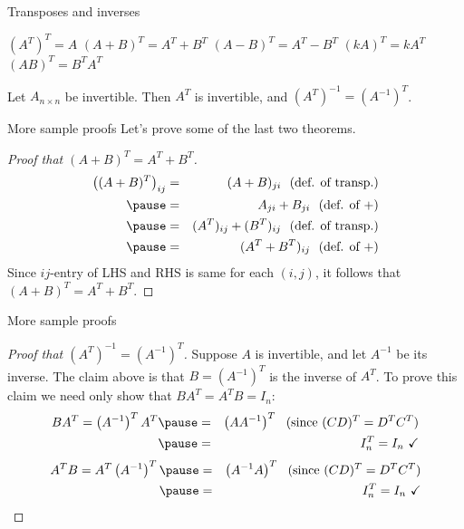 \begin{frame}{Transposes and inverses}
\begin{theorem}
\begin{multicols}{2}
\bb[(a)]
\ii $\left(A^T\right)^T=A$
\ii $(A+B)^T=A^T+B^T$
\ii $(A-B)^T=A^T-B^T$
\ii $(kA)^T=kA^T$
\ii $(AB)^T=B^TA^T$
\ee
\end{multicols}
\end{theorem}
\pause\begin{theorem}
Let $A_{n\times n}$ be invertible. Then $A^T$ is invertible, and $\left(A^T\right)^{-1}=\left(A^{-1}\right)^T$. 
\end{theorem}
\end{frame}
\begin{frame}{More sample proofs}
Let's prove some of the last two theorems. 
\pause
\begin{proof}[Proof that $(A+B)^T=A^T+B^T$]
\begin{eqnarray*}
\left((A+B)^T\right)_{ij}&=&(A+B)_{ji} \ \text{ (def. of transp.)}\\
\pause &=&A_{ji}+B_{ji} \ \text{ (def. of +)}\\
\pause &=&(A^T)_{ij}+(B^T)_{ij} \ \text{ (def. of transp.)}\\
\pause &=&(A^T+B^T)_{ij} \ \text{ (def. of +)}
\end{eqnarray*}
Since $ij$-entry of LHS and RHS is same for each $(i,j)$, it follows that $(A+B)^T=A^T+B^T$.  
\end{proof}
\end{frame}
\begin{frame}{More sample proofs}
\begin{proof}[Proof that $\left(A^T\right)^{-1}=\left(A^{-1}\right)^T$]
\pause Suppose $A$ is invertible, and let $A^{-1}$ be its inverse. The claim above is that $B=\left(A^{-1}\right)^T$ is the inverse of $A^T$.  To prove this claim we need only show that $BA^T=A^TB=I_n$: 
\pause
\begin{eqnarray*}
BA^T=\left(A^{-1}\right)^TA^T\pause &=&\left(AA^{-1}\right)^T \ \text{ (since $(CD)^T=D^TC^T$)}\\
\pause &=&I_n^T=I_n \ \checkmark
\end{eqnarray*}
\pause
\begin{eqnarray*}
A^TB=A^T\left(A^{-1}\right)^T\pause &=&\left(A^{-1}A\right)^T \ \text{ (since $(CD)^T=D^TC^T$)}\\
\pause &=&I_n^T=I_n \ \checkmark
\end{eqnarray*}

\end{proof}
\end{frame}